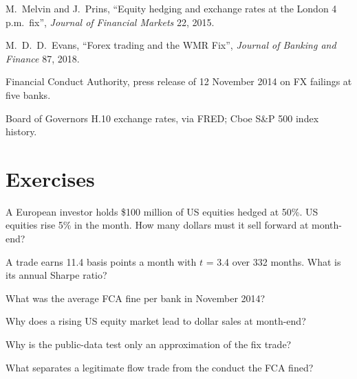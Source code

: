 \begin{omsources}
\item M.~Melvin and J.~Prins, ``Equity hedging and exchange rates at the London 4 p.m.\ fix'', \emph{Journal of Financial Markets} 22, 2015.
\item M.~D.~D.~Evans, ``Forex trading and the WMR Fix'', \emph{Journal of Banking and Finance} 87, 2018.
\item Financial Conduct Authority, press release of 12 November 2014 on FX failings at five banks.
\item Board of Governors H.10 exchange rates, via FRED; Cboe S\&P 500 index history.
\end{omsources}

\section{Exercises}

\begin{exercise}[$\star$]\label{exo:s2:fx-flow-strategies:1}
A European investor holds \$100 million of US equities hedged at 50\%. US equities rise 5\% in the month. How many dollars must it sell forward at
month-end?
\end{exercise}

\begin{exercise}[$\star$]\label{exo:s2:fx-flow-strategies:2}
A trade earns 11.4 basis points a month with $t$ = 3.4 over 332 months. What is its annual Sharpe ratio?
\end{exercise}

\begin{exercise}[$\star$]\label{exo:s2:fx-flow-strategies:3}
What was the average FCA fine per bank in November 2014?
\end{exercise}

\begin{exercise}[$\star\star$]\label{exo:s2:fx-flow-strategies:4}
Why does a rising US equity market lead to dollar sales at month-end?
\end{exercise}

\begin{exercise}[$\star\star$]\label{exo:s2:fx-flow-strategies:5}
Why is the public-data test only an approximation of the fix trade?
\end{exercise}

\begin{exercise}[$\star\star$]\label{exo:s2:fx-flow-strategies:6}
What separates a legitimate flow trade from the conduct the FCA fined?
\end{exercise}


